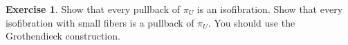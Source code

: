 \documentclass{article}
\theoremstyle{definition}
\newtheorem{exercise}[definition]{Exercise}
\begin{document}
\begin{exercise}
    Show that every pullback of $\pi_U$ is an isofibration. Show that every isofibration with small fibers is a pullback of $\pi_U$. You should use the Grothendieck construction.
\end{exercise}



\end{document}
